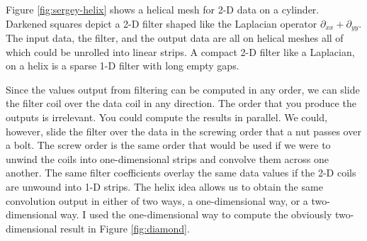 
Figure \ref{fig:sergey-helix} shows a helical mesh for 2-D data on a cylinder.
Darkened squares depict a 2-D filter
shaped like the Laplacian operator $\partial_{xx}+\partial_{yy}$.
The input data, the filter, and the output data are all on helical meshes
all of which could be unrolled into linear strips.
A compact 2-D filter like a Laplacian,
on a helix is a sparse 1-D filter with long empty gaps.


\par
Since the values output from filtering can be computed
in any order, we can slide the filter coil
over the data coil in any direction.
The order that you produce the outputs is irrelevant.
You could compute the results in parallel.
We could, however, slide the filter over the data in the screwing order
that a nut passes over a bolt.
The screw order is the same order that would be used
if we were to unwind the coils into one-dimensional strips
and convolve them across one another.
The same filter coefficients overlay the same data values
if the 2-D coils are unwound into 1-D strips.
The helix idea allows us to obtain the same convolution output
in either of two ways, a one-dimensional way, or a two-dimensional way.
I used the one-dimensional way to compute the obviously two-dimensional
result in Figure \ref{fig:diamond}.



